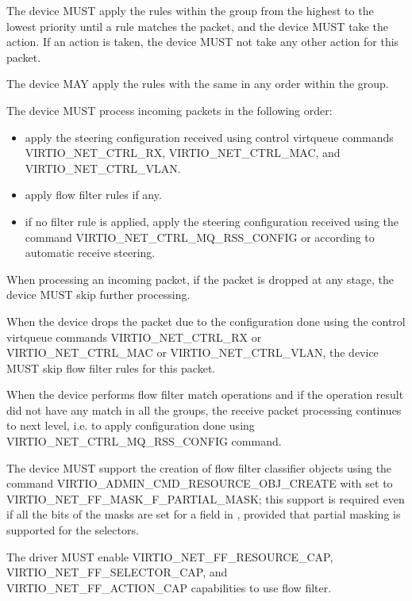 The device MUST apply the rules within the group from the highest to the
lowest priority until a rule matches the packet, and the device MUST take
the action. If an action is taken, the device MUST not take any other
action for this packet.

The device MAY apply the rules with the same  in any
order within the group.

The device MUST process incoming packets in the following order:
\begin{itemize}
\item apply the steering configuration received using control virtqueue
      commands VIRTIO_NET_CTRL_RX, VIRTIO_NET_CTRL_MAC, and
      VIRTIO_NET_CTRL_VLAN.
\item apply flow filter rules if any.
\item if no filter rule is applied, apply the steering configuration
      received using the command VIRTIO_NET_CTRL_MQ_RSS_CONFIG
      or according to automatic receive steering.
\end{itemize}

When processing an incoming packet, if the packet is dropped at any stage, the device
MUST skip further processing.

When the device drops the packet due to the configuration done using the control
virtqueue commands VIRTIO_NET_CTRL_RX or VIRTIO_NET_CTRL_MAC or VIRTIO_NET_CTRL_VLAN,
the device MUST skip flow filter rules for this packet.

When the device performs flow filter match operations and if the operation
result did not have any match in all the groups, the receive packet processing
continues to next level, i.e. to apply configuration done using
VIRTIO_NET_CTRL_MQ_RSS_CONFIG command.

The device MUST support the creation of flow filter classifier objects
using the command VIRTIO_ADMIN_CMD_RESOURCE_OBJ_CREATE with 
set to VIRTIO_NET_FF_MASK_F_PARTIAL_MASK;
this support is required even if all the bits of the masks are set for
a field in , provided that partial masking is supported
for the selectors.


The driver MUST enable VIRTIO_NET_FF_RESOURCE_CAP, VIRTIO_NET_FF_SELECTOR_CAP,
and VIRTIO_NET_FF_ACTION_CAP capabilities to use flow filter.

